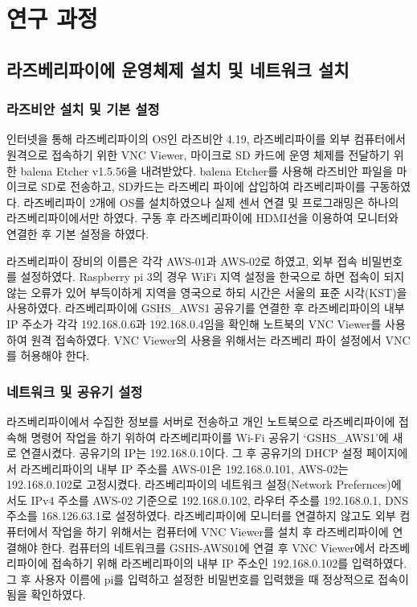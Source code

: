 \section{연구 과정}

\subsection{라즈베리파이에 운영체제 설치 및 네트워크 설치}
\subsubsection{라즈비안 설치 및 기본 설정}
인터넷을 통해 라즈베리파이의 OS인 라즈비안 4.19, 라즈베리파이를 외부 컴퓨터에서 원격으로 접속하기 위한 VNC Viewer, 마이크로 SD 카드에 운영 체제를 전달하기 위한 balena Etcher v1.5.56을 내려받았다. balena Etcher를 사용해 라즈비안 파일을 마이크로 SD로 전송하고, SD카드는 라즈베리 파이에 삽입하여 라즈베리파이를 구동하였다. 라즈베리파이 2개에 OS를 설치하였으나 실제 센서 연결 및 프로그래밍은 하나의 라즈베리파이에서만 하였다.
구동 후 라즈베리파이에 HDMI선을 이용하여 모니터와 연결한 후 기본 설정을 하였다. 

라즈베리파이 장비의 이름은 각각 AWS-01과 AWS-02로 하였고, 외부 접속 비밀번호를 설정하였다. Raspberry pi 3의 경우 WiFi 지역 설정을 한국으로 하면 접속이 되지 않는 오류가 있어 부득이하게 지역을 영국으로 하되 시간은 서울의 표준 시각(KST)을 사용하였다. 라즈베리파이에 GSHS\_AWS1 공유기를 연결한 후 라즈베리파이의 내부 IP 주소가 각각 192.168.0.6과 192.168.0.4임을 확인해 노트북의 VNC Viewer를 사용하여 원격 접속하였다. VNC Viewer의 사용을 위해서는 라즈베리 파이 설정에서 VNC를 허용해야 한다.

\subsubsection{네트워크 및 공유기 설정}
라즈베리파이에서 수집한 정보를 서버로 전송하고 개인 노트북으로 라즈베리파이에 접속해 명령어 작업을 하기 위하여 라즈베리파이를 Wi-Fi 공유기 ‘GSHS\_AWS1’에 새로 연결시켰다. 공유기의 IP는 192.168.0.1이다. 그 후 공유기의 DHCP 설정 페이지에서 라즈베리파이의 내부 IP 주소를 AWS-01은 192.168.0.101, AWS-02는 192.168.0.102로 고정시켰다. 라즈베리파이의 네트워크 설정(Network Prefernces)에서도 IPv4 주소를 AWS-02 기준으로 192.168.0.102, 라우터 주소를 192.168.0.1, DNS 주소를 168.126.63.1로 설정하였다. 라즈베리파이에 모니터를 연결하지 않고도 외부 컴퓨터에서 작업을 하기 위해서는 컴퓨터에 VNC Viewer를 설치 후 라즈베리파이에 연결해야 한다. 컴퓨터의 네트워크를 GSHS-AWS01에 연결 후 VNC Viewer에서 라즈베리파이에 접속하기 위해 라즈베리파이의 내부 IP 주소인 192.168.0.102를 입력하였다. 그 후 사용자 이름에 pi를 입력하고 설정한 비밀번호를 입력했을 때 정상적으로 접속이 됨을 확인하였다.

